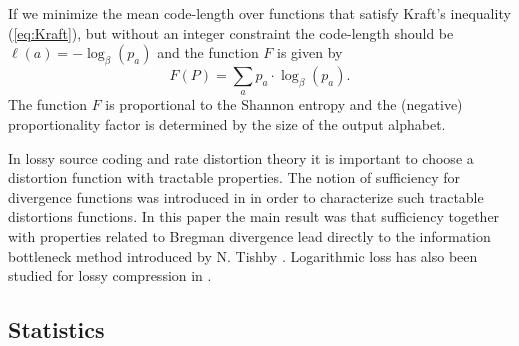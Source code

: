 \documentclass[10pt,a4paper,draft]{article}
\begin{document}
If we minimize the mean code-length over functions that satisfy
Kraft's inequality (\ref{eq:Kraft}), but without an integer constraint the code-length
should be $\ell\left(a\right)=-\log_{\beta}\left(p_{a}\right)$ and the
function $F$ is given by
\[
F\left(P\right)=\sum_{a}p_{a}\cdot\log_{\beta}\left(p_{a}\right).
\]
The function $F$ is proportional to the Shannon entropy and the (negative)
proportionality factor is determined by the size of the output alphabet.

In lossy source coding and rate distortion theory it is important to choose a distortion function with tractable properties. The notion of sufficiency for divergence functions was introduced in \cite{Harremoes2007a} in order to characterize such tractable distortions functions. In this paper the main result was that sufficiency together with properties related to Bregman divergence lead directly to the information bottleneck method introduced by N. Tishby \cite{Tishby1999}. Logarithmic loss has also been studied for lossy compression in \cite{No2015}.

\subsection{Statistics}
\end{document}

